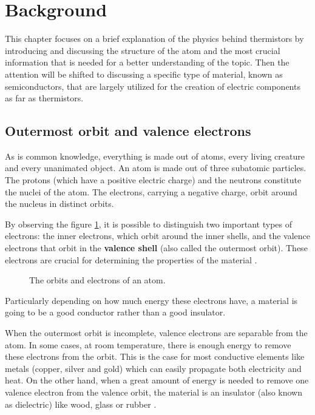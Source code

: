 \section{Background}
This chapter focuses on a brief explanation of the physics behind thermistors by introducing and discussing the structure of the atom and the most crucial information that is needed for a better understanding of the topic. Then the attention will be shifted to discussing a specific type of material, known as semiconductors, that are largely utilized for the creation of electric components as far as thermistors.


\subsection{Outermost orbit and valence electrons}
As is common knowledge, everything is made out of atoms, every living creature and every unanimated object. An atom is made out of three subatomic particles. The protons (which have a positive electric charge) and the neutrons constitute the nuclei of the atom. The electrons, carrying a negative charge, orbit around the nucleus in distinct orbits.

By observing the figure \ref{fig:atom-structure}, it is possible to distinguish two important types of electrons: the inner electrons, which orbit around the inner shells, and the valence electrons that orbit in the \textbf{valence shell} (also called the outermost orbit). These electrons are crucial for determining the properties of the material \cite{Gupta20163}.
\begin{figure}[h]
    \centering
    
    \caption{The orbits and electrons of an atom.}
    \label{fig:atom-structure}
\end{figure}
Particularly depending on how much energy these electrons have, a material is going to be a good conductor rather than a good insulator.

When the outermost orbit is incomplete, valence electrons are separable from the atom. In some cases, at room temperature, there is enough energy to remove these electrons from the orbit. This is the case for most conductive elements like metals (copper, silver and gold) which can easily propagate both electricity and heat. On the other hand, when a great amount of energy is needed to remove one valence electron from the valence orbit, the material is an insulator (also known as dielectric) like wood, glass or rubber \cite{Gupta20163}. 

